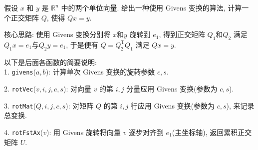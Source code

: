 \documentclass[12pt, answers]{exam}     %
\newcommand{\R}{\mathbb{R}}
\newcommand{\T}{\mathrm{T}}
\begin{document}
\begin{questions}
\question{}
假设 \( x \) 和 \( y \) 是 \( \R^n \) 中的两个单位向量. 给出一种使用 Givens 变换的算法, 计算一个正交矩阵 \( Q \), 使得 \( Qx = y \). 

\begin{solution}
核心思路: 使用 Givens 变换分别将 \( x \)和\( y \) 旋转到 \( e_1 \), 得到正交矩阵 \( Q_1 \)和\( Q_2 \) 满足 \( Q_1x = e_1 \)与\(Q_2y = e_1 \),
于是便有 \( Q = Q_2^{\T} Q_1 \) 满足 \( Qx = y \).

以下是后面各函数的简要说明: \\
1. \texttt{givens}($a, b$):
   计算单次 Givens 变换的旋转参数 \( c, s \). 

2. \texttt{rotVec}($v, i, j, c, s$):
   对向量 \( v \) 的第 \( i, j \) 分量应用 Givens 变换(参数为 \( c, s \)). 

3. \texttt{rotMat}($Q, i, j, c, s$):
   对矩阵 \( Q \) 的第 \( i, j \) 行应用 Givens 变换(参数为 \( c, s \)), 来记录总变换. 

4. \texttt{rotFstAx}($v$):
   用 Givens 旋转将向量 \( v \) 逐步对齐到 \( e_1 \)(主坐标轴), 返回累积正交矩阵 \( U \). 


\end{solution}
\end{questions}
\end{document}
